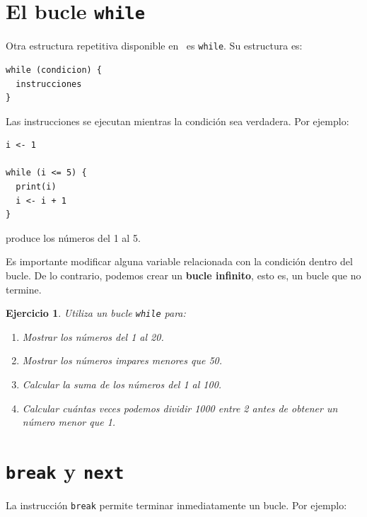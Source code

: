 \documentclass[11pt,a4paper]{article}
\newcommand{\R}{\textcolor{azuluc}{\faIcon{r-project}}}
\theoremstyle{exercise}
\newtheorem{exercise}{Ejercicio}
\begin{document}
\section{El bucle \texttt{while}}

Otra estructura repetitiva disponible en \R\ es \texttt{while}. Su estructura es:

\begin{lstlisting}[style=rstyle]
while (condicion) {
  instrucciones
}
\end{lstlisting}

\noindent Las instrucciones se ejecutan mientras la condición sea verdadera. Por ejemplo:

\begin{lstlisting}[style=rstyle]
i <- 1

while (i <= 5) {
  print(i)
  i <- i + 1
}
\end{lstlisting}

\noindent produce los números del 1 al 5.

Es importante modificar alguna variable relacionada con la condición dentro del bucle.
De lo contrario, podemos crear un \textbf{bucle infinito}, esto es, un bucle que no termine.

\begin{exercise}
Utiliza un bucle \texttt{while} para:

\begin{enumerate}[label=\alph*)]
  \item Mostrar los números del 1 al 20.
  \item Mostrar los números impares menores que 50.
  \item Calcular la suma de los números del 1 al 100.
  \item Calcular cuántas veces podemos dividir 1000 entre 2 antes de obtener un número menor que 1.
\end{enumerate}
\end{exercise}

\section{\texttt{break} y \texttt{next}}

La instrucción \texttt{break} permite terminar inmediatamente un bucle. Por ejemplo:
\end{document}
